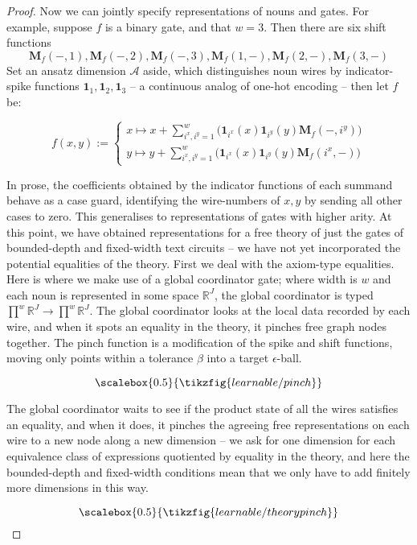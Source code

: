 \begin{fullwidth}
\begin{theorem}
\begin{proof}
Now we can jointly specify representations of nouns and gates. For example, suppose $f$ is a binary gate, and that $w=3$. Then there are six shift functions $$\mathbf{M}_f(-,1),\mathbf{M}_f(-,2),\mathbf{M}_f(-,3),\mathbf{M}_f(1,-),\mathbf{M}_f(2,-),\mathbf{M}_f(3,-)$$ Set an ansatz dimension $\mathcal{A}$ aside, which distinguishes noun wires by indicator-spike functions $\mathbf{1}_{1},\mathbf{1}_{2},\mathbf{1}_{3}$ -- a continuous analog of one-hot encoding -- then let $f$ be:

\[f(x,y) := \begin{cases}
x \mapsto x + \sum\limits^{w}_{i^x,i^y =1}\big(\mathbf{1}_{i^x}(x)\mathbf{1}_{i^y}(y) \mathbf{M}_f(-,i^y)  \big) \\
y \mapsto y + \sum\limits^{w}_{i^x,i^y =1}\big(\mathbf{1}_{i^x}(x)\mathbf{1}_{i^y}(y) \mathbf{M}_f(i^x,-)  \big)
\end{cases}
\]

In prose, the coefficients obtained by the indicator functions of each summand behave as a case guard, identifying the wire-numbers of $x,y$ by sending all other cases to zero. This generalises to representations of gates with higher arity. At this point, we have obtained representations for a free theory of just the gates of bounded-depth and fixed-width text circuits -- we have not yet incorporated the potential equalities of the theory. First we deal with the axiom-type equalities. Here is where we make use of a global coordinator gate; where width is $w$ and each noun is represented in some space $\mathbb{R}^J$, the global coordinator is typed $\prod\limits^w \mathbb{R}^J \rightarrow \prod\limits^w \mathbb{R}^J$. The global coordinator looks at the local data recorded by each wire, and when it spots an equality in the theory, it pinches free graph nodes together. The pinch function is a modification of the spike and shift functions, moving only points within a tolerance $\beta$ into a target $\epsilon$-ball.

\[\scalebox{0.5}{\tikzfig{learnable/pinch}}\]

The global coordinator waits to see if the product state of all the wires satisfies an equality, and when it does, it pinches the agreeing free representations on each wire to a new node along a new dimension -- we ask for one dimension for each equivalence class of expressions quotiented by equality in the theory, and here the bounded-depth and fixed-width conditions mean that we only have to add finitely more dimensions in this way.

\[\scalebox{0.5}{\tikzfig{learnable/theorypinch}}\]


\end{proof}
\end{theorem}
\end{fullwidth}

